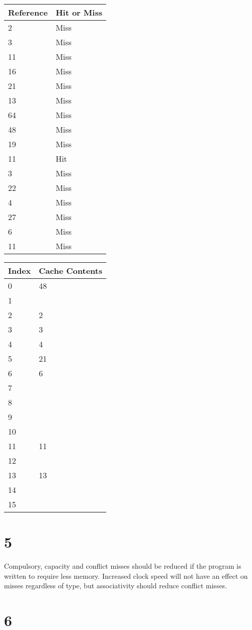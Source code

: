 \documentclass{article}
\begin{document}
\begin{tabular}{|l|l|}
\hline
Reference & Hit or Miss \\ \hline
2 & Miss \\ \hline
3 & Miss \\ \hline
11 & Miss \\ \hline
16 &  Miss \\ \hline
21 &  Miss \\ \hline
13 &  Miss \\ \hline
64 &  Miss \\ \hline
48 &  Miss \\ \hline
19 &  Miss \\ \hline
11 & Hit \\ \hline
3 &  Miss \\ \hline
22 &  Miss \\ \hline
4 &  Miss \\ \hline
27 &  Miss \\ \hline
6 &  Miss \\ \hline
11 &  Miss \\ \hline
\end{tabular}

\begin{tabular}{|l|l|}
\hline
Index & Cache Contents \\ \hline
0 & 48 \\ \hline
1 & \\ \hline
2 & 2 \\ \hline
3 & 3 \\ \hline
4 & 4 \\ \hline
5 & 21 \\ \hline
6 & 6 \\ \hline
7 & \\ \hline
8 & \\ \hline
9 & \\ \hline
10 & \\ \hline
11 & 11 \\ \hline
12 & \\ \hline
13 & 13 \\ \hline
14 & \\ \hline
15 & \\ \hline
\end{tabular}

\section*{5} 

Compulsory, capacity and conflict misses should be reduced if the program is written to require less memory. Increased clock speed will not have an effect on misses regardless of type, but associativity should reduce conflict misses.

\section*{6}
\end{document}
